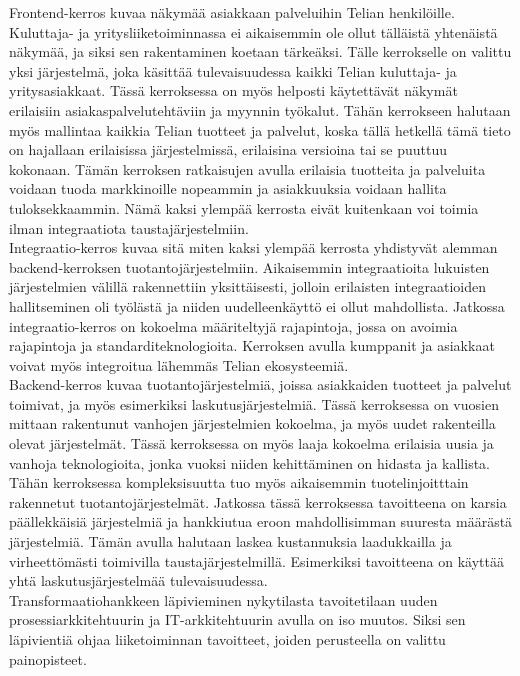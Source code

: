 \documentclass[finnish,12pt,a4paper,pdftex]{article}
\begin{document}
\noindent Frontend-kerros kuvaa näkymää asiakkaan palveluihin Telian henkilöille. Kuluttaja- ja yritysliiketoiminnassa ei aikaisemmin ole ollut tälläistä yhtenäistä näkymää, ja siksi sen rakentaminen koetaan tärkeäksi. Tälle kerrokselle on valittu yksi järjestelmä, joka käsittää tulevaisuudessa kaikki Telian kuluttaja- ja yritysasiakkaat. Tässä kerroksessa on myös helposti käytettävät näkymät erilaisiin asiakaspalvelutehtäviin ja myynnin työkalut. Tähän kerrokseen halutaan myös mallintaa kaikkia Telian tuotteet ja palvelut, koska tällä hetkellä tämä tieto on hajallaan erilaisissa järjestelmissä, erilaisina versioina tai se puuttuu kokonaan. Tämän kerroksen ratkaisujen avulla erilaisia tuotteita ja palveluita voidaan tuoda markkinoille nopeammin ja asiakkuuksia voidaan hallita tuloksekkaammin. Nämä kaksi ylempää kerrosta eivät kuitenkaan voi toimia ilman integraatiota taustajärjestelmiin.\\

\noindent Integraatio-kerros kuvaa sitä miten kaksi ylempää kerrosta yhdistyvät alemman backend-kerroksen tuotantojärjestelmiin. Aikaisemmin integraatioita lukuisten järjestelmien välillä rakennettiin yksittäisesti, jolloin erilaisten integraatioiden hallitseminen oli työlästä ja niiden uudelleenkäyttö ei ollut mahdollista. Jatkossa integraatio-kerros on kokoelma määriteltyjä rajapintoja, jossa on avoimia rajapintoja ja standarditeknologioita. Kerroksen avulla kumppanit ja asiakkaat voivat myös integroitua lähemmäs Telian ekosysteemiä. \\

\noindent Backend-kerros kuvaa tuotantojärjestelmiä, joissa asiakkaiden tuotteet ja palvelut toimivat, ja myös esimerkiksi laskutusjärjestelmiä. Tässä kerroksessa on vuosien mittaan rakentunut vanhojen järjestelmien kokoelma, ja myös uudet rakenteilla olevat järjestelmät. Tässä kerroksessa on myös laaja kokoelma erilaisia uusia ja vanhoja teknologioita, jonka vuoksi niiden kehittäminen on hidasta ja kallista. Tähän kerroksessa kompleksisuutta tuo myös aikaisemmin tuotelinjoitttain rakennetut tuotantojärjestelmät. Jatkossa tässä kerroksessa tavoitteena on karsia päällekkäisiä järjestelmiä ja hankkiutua eroon mahdollisimman suuresta määrästä järjestelmiä. Tämän avulla halutaan laskea kustannuksia laadukkailla ja virheettömästi toimivilla taustajärjestelmillä. Esimerkiksi tavoitteena on käyttää yhtä laskutusjärjestelmää tulevaisuudessa.\\

Transformaatiohankkeen läpivieminen nykytilasta tavoitetilaan uuden prosessiarkkitehtuurin ja IT-arkkitehtuurin avulla on iso muutos. Siksi sen läpivientiä ohjaa liiketoiminnan tavoitteet, joiden perusteella on valittu painopisteet.\\
\end{document}
